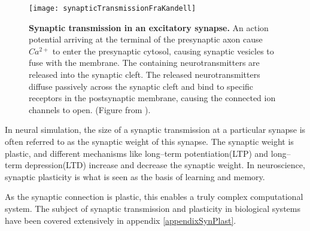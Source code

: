 \begin{figure}[hbt!p]
    \centering
    \texttt{[image: synapticTransmissionFraKandell]}	%
 	  \caption{\textbf{Synaptic transmission in an excitatory synapse.} 
			An action potential arriving at the terminal of the presynaptic axon cause $Ca^{2+}$ to enter the presynaptic cytosol, causing synaptic vesicles to fuse with the membrane.
			The containing neurotransmitters are released into the synaptic cleft.
			The released neurotransmitters diffuse passively across the synaptic cleft and bind to specific receptors in the postsynaptic membrane, causing the connected ion channels to open.
			(Figure from \cite{PrinciplesOfNeuralScience4edKAP10}).
			}
    \label{figActionPotential}
\end{figure}

		In neural simulation, the size of a synaptic transmission at a particular synapse is often referred to as the synaptic weight of this synapse.
		The synaptic weight is plastic, and different mechanisms like long--term potentiation(LTP) and long--term depression(LTD) increase and decrease the synaptic weight.
		In neuroscience, synaptic plasticity is what is seen as the basis of learning and memory\cite{NeuroscienceExploringTheBrain3edKAP25}. %

		As the synaptic connection is plastic, this enables a truly complex computational system.
		The subject of synaptic transmission and plasticity in biological systems have been covered extensively in appendix \ref{appendixSynPlast}.

